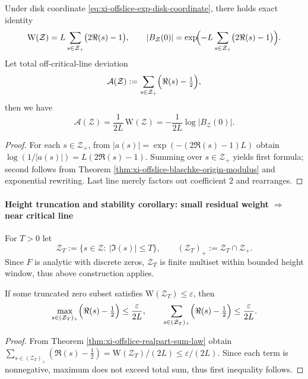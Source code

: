 \begin{theorem}\label{thm:xi-offslice-realpart-sum-law}
Under disk coordinate \eqref{eq:xi-offslice-exp-disk-coordinate}, there holds exact identity
\[
\mathrm{W}(\mathcal Z)
= L\sum_{s\in\mathcal Z_{+}}\bigl(2\Re(s)-1\bigr),
\qquad
|B_{\mathcal Z}(0)|
=\exp\!\Bigl(-L\sum_{s\in\mathcal Z_{+}}\bigl(2\Re(s)-1\bigr)\Bigr).
\]
Let total off-critical-line deviation
\[
\mathcal A(\mathcal Z):=\sum_{s\in\mathcal Z_{+}}\Bigl(\Re(s)-\tfrac12\Bigr),
\]
then we have
\[
\mathcal A(\mathcal Z)=\frac{1}{2L}\,\mathrm{W}(\mathcal Z)
=-\frac{1}{2L}\log|B_{\mathcal Z}(0)|.
\]
\end{theorem}

\begin{proof}
For each \(s\in\mathcal Z_{+}\), from \(|a(s)|=\exp(-(2\Re(s)-1)L)\) obtain
\(
\log(1/|a(s)|)=L(2\Re(s)-1)
\).
Summing over \(s\in\mathcal Z_{+}\) yields first formula; second follows from Theorem \ref{thm:xi-offslice-blaschke-origin-modulus} and exponential rewriting.
Last line merely factors out coefficient \(2\) and rearranges.
\end{proof}

\paragraph{Height truncation and stability corollary: small residual weight \texorpdfstring{$\Rightarrow$}{->} near critical line}
For \(T>0\) let
\[
\mathcal Z_T:=\{s\in\mathcal Z:\ |\Im(s)|\le T\},
\qquad
(\mathcal Z_T)_{+}:=\mathcal Z_T\cap\mathcal Z_{+}.
\]
Since \(F\) is analytic with discrete zeros, \(\mathcal Z_T\) is finite multiset within bounded height window, thus above construction applies.

\begin{corollary}\label{cor:xi-offslice-near-critical-stability}
If some truncated zero subset satisfies \(\mathrm{W}(\mathcal Z_T)\le \varepsilon\), then
\[
\max_{s\in(\mathcal Z_T)_{+}}\Bigl(\Re(s)-\tfrac12\Bigr)\le \frac{\varepsilon}{2L},
\qquad
\sum_{s\in(\mathcal Z_T)_{+}}\Bigl(\Re(s)-\tfrac12\Bigr)\le \frac{\varepsilon}{2L}.
\]
\end{corollary}

\begin{proof}
From Theorem \ref{thm:xi-offslice-realpart-sum-law} obtain
\(
\sum_{s\in(\mathcal Z_T)_{+}}(\Re(s)-\tfrac12)=\mathrm{W}(\mathcal Z_T)/(2L)\le \varepsilon/(2L)
\).
Since each term is nonnegative, maximum does not exceed total sum, thus first inequality follows.
\end{proof}

